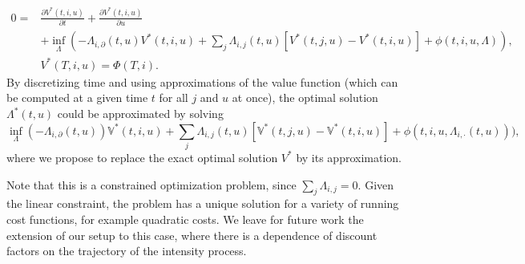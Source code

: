 \documentclass[11pt,leqno]{amsart}
\numberwithin{table}{section}
\numberwithin{figure}{section}
\numberwithin{equation}{section}
\newcommand{\1}{{\mathds{1}}}
\newcommand{\0}{\mat{0}}
\begin{document}
{\begin{align*}
0 =& \frac{\partial V^*(t, i, u) }{\partial t} + \frac{\partial V^*(t, i, u) }{\partial u} \\
&+  \inf_{\Lambda} (- \Lambda_{i, \partial} (t, u) V^*(t, i, u)  + \sum_{j}\Lambda_{i,j} (t,u) [V^*(t, j, u) - V^*(t, i, u)]
  + \phi(t, i, u, \Lambda)),\\
&V^*(T, i, u) = \Phi (T, i).
\end{align*}
By discretizing time and using approximations of the value function (which can be computed at a given time $t$ for all $j$ and $u$ at once),  the optimal solution $\Lambda^*(t, u)$ could  be approximated by solving 
$$\inf_{\Lambda} (- \Lambda_{i, \partial} (t, u)) \mathbb V^*(t, i, u)  + \sum_{j}\Lambda_{i,j} (t,u) [\mathbb V^*(t, j, u) - \mathbb V^*(t, i, u)]
  + \phi(t, i, u, \Lambda_{i, \cdot} (t, u))), $$
where we propose to replace the exact optimal solution $V^*$ by its approximation.

Note that this is a constrained optimization problem, since $\sum_j \Lambda_{i,j} = 0$. Given the linear constraint, the problem has a unique solution for a variety of running cost functions, for example quadratic costs.
We leave for future work the extension of our setup to this case, where there is a dependence of discount factors on the trajectory of the intensity process.
\appendix

}
\end{document}
